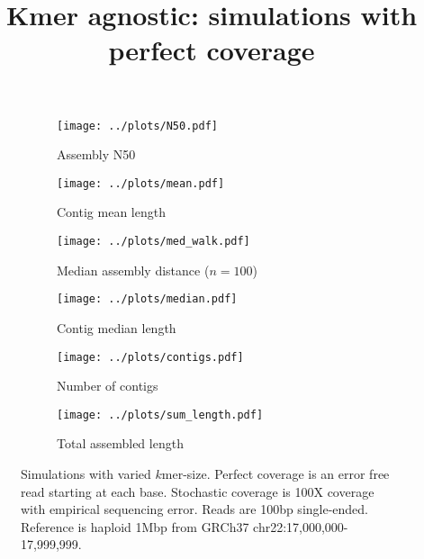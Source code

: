 \documentclass{article}
\title{Kmer agnostic: simulations with perfect coverage}
\begin{document}
\begin{figure}[ht]
\begin{subfigure}{.5\textwidth}
  \centering
  \caption{Assembly N50}
  \texttt{[image: ../plots/N50.pdf]}
\end{subfigure}
\begin{subfigure}{.5\textwidth}
  \centering
  \caption{Contig mean length}
  \texttt{[image: ../plots/mean.pdf]}
\end{subfigure}

\begin{subfigure}{.5\textwidth}
  \centering
  \caption{Median assembly distance ($n=100$)}
  \texttt{[image: ../plots/med\_walk.pdf]}
\end{subfigure}
\begin{subfigure}{.5\textwidth}
  \centering
  \caption{Contig median length}
  \texttt{[image: ../plots/median.pdf]}
\end{subfigure}

\begin{subfigure}{.5\textwidth}
  \centering
  \caption{Number of contigs}
  \texttt{[image: ../plots/contigs.pdf]}
\end{subfigure}
\begin{subfigure}{.5\textwidth}
  \centering
  \caption{Total assembled length}
  \texttt{[image: ../plots/sum\_length.pdf]}
\end{subfigure}
\caption{Simulations with varied $k$mer-size. Perfect coverage is an error free read starting at each base. Stochastic coverage is 100X coverage with empirical sequencing error. Reads are 100bp single-ended. Reference is haploid 1Mbp from GRCh37 chr22:17,000,000-17,999,999.}
\label{fig:kmer_agnostic}
\end{figure}
\end{document}
